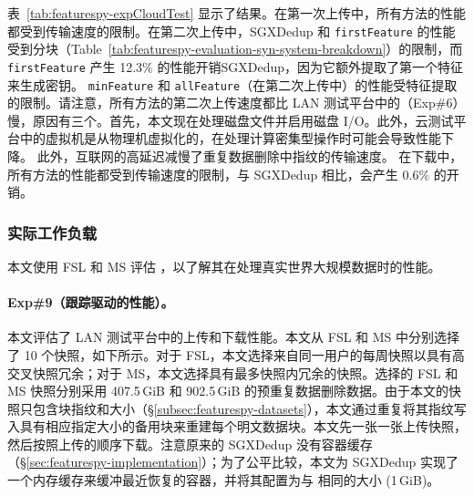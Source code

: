 表~\ref{tab:featurespy-expCloudTest} 显示了结果。在第一次上传中，所有方法的性能都受到传输速度的限制。在第二次上传中，SGXDedup 和 {\tt firstFeature} 的性能受到分块（Table~\ref{tab:featurespy-evaluation-syn-system-breakdown}）的限制，而 {\tt firstFeature} 产生 12.3\% 的性能开销SGXDedup，因为它额外提取了第一个特征来生成密钥。 {\tt minFeature} 和 {\tt allFeature}（在第二次上传中）的性能受特征提取的限制。请注意，所有方法的第二次上传速度都比 LAN 测试平台中的（Exp\#6）慢，原因有三个。首先，本文现在处理磁盘文件并启用磁盘 I/O。此外，云测试平台中的虚拟机是从物理机虚拟化的，在处理计算密集型操作时可能会导致性能下降。
此外，互联网的高延迟减慢了重复数据删除中指纹的传输速度。
在下载中，所有方法的性能都受到传输速度的限制，与 SGXDedup 相比，\prototype 会产生 0.6\% 的开销。


\subsubsection{实际工作负载}
\label{subsec:featurespy-real}
本文使用 FSL 和 MS 评估 \prototype，以了解其在处理真实世界大规模数据时的性能。

\paragraph*{Exp\#9（跟踪驱动的性能）。}
本文评估了 LAN 测试平台中的上传和下载性能。本文从 FSL 和 MS 中分别选择了 10 个快照，如下所示。对于 FSL，本文选择来自同一用户的每周快照以具有高交叉快照冗余；对于 MS，本文选择具有最多快照内冗余的快照。选择的 FSL 和 MS 快照分别采用 407.5\,GiB 和 902.5\,GiB 的预重复数据删除数据。由于本文的快照只包含块指纹和大小（\S\ref{subsec:featurespy-datasets}），本文通过重复将其指纹写入具有相应指定大小的备用块来重建每个明文数据块。本文先一张一张上传快照，然后按照上传的顺序下载。注意原来的 SGXDedup \cite{ren21} 没有容器缓存（\S\ref{sec:featurespy-implementation}）；为了公平比较，本文为 SGXDedup 实现了一个内存缓存来缓冲最近恢复的容器，并将其配置为与 \prototype 相同的大小 (1\,GiB)。


